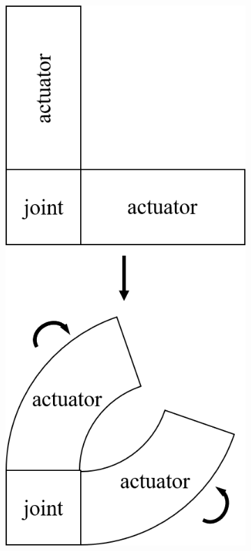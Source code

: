\begin{figure}[h]
	\centering
	\begin{subfigure}[c]{0.4\textwidth}
		\centering
		\includegraphics[width=\textwidth]{SR_JA.png}

\end{subfigure}
\end{figure}
